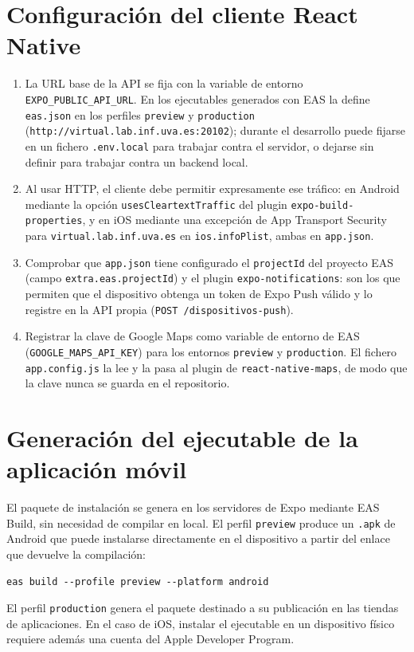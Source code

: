 \section{Configuración del cliente React Native}

\begin{enumerate}
    \item La URL base de la API se fija con la variable de entorno \texttt{EXPO\_PUBLIC\_API\_URL}. En los ejecutables generados con EAS la define \texttt{eas.json} en los perfiles \texttt{preview} y \texttt{production} (\texttt{http://virtual.lab.inf.uva.es:20102}); durante el desarrollo puede fijarse en un fichero \texttt{.env.local} para trabajar contra el servidor, o dejarse sin definir para trabajar contra un backend local.
    \item Al usar HTTP, el cliente debe permitir expresamente ese tráfico: en Android mediante la opción \texttt{usesCleartextTraffic} del plugin \texttt{expo-build-properties}, y en iOS mediante una excepción de App Transport Security para \texttt{virtual.lab.inf.uva.es} en \texttt{ios.infoPlist}, ambas en \texttt{app.json}.
    \item Comprobar que \texttt{app.json} tiene configurado el \texttt{projectId} del proyecto EAS (campo \texttt{extra.eas.projectId}) y el plugin \texttt{expo-notifications}: son los que permiten que el dispositivo obtenga un token de Expo Push válido y lo registre en la API propia (\texttt{POST /dispositivos-push}).
    \item Registrar la clave de Google Maps como variable de entorno de EAS (\texttt{GOOGLE\_MAPS\_API\_KEY}) para los entornos \texttt{preview} y \texttt{production}. El fichero \texttt{app.config.js} la lee y la pasa al plugin de \texttt{react-native-maps}, de modo que la clave nunca se guarda en el repositorio.
\end{enumerate}

\section{Generación del ejecutable de la aplicación móvil}

El paquete de instalación se genera en los servidores de Expo mediante EAS Build, sin necesidad de compilar en local. El perfil \texttt{preview} produce un \texttt{.apk} de Android que puede instalarse directamente en el dispositivo a partir del enlace que devuelve la compilación:
\begin{verbatim}
eas build --profile preview --platform android
\end{verbatim}
El perfil \texttt{production} genera el paquete destinado a su publicación en las tiendas de aplicaciones. En el caso de iOS, instalar el ejecutable en un dispositivo físico requiere además una cuenta del Apple Developer Program.
